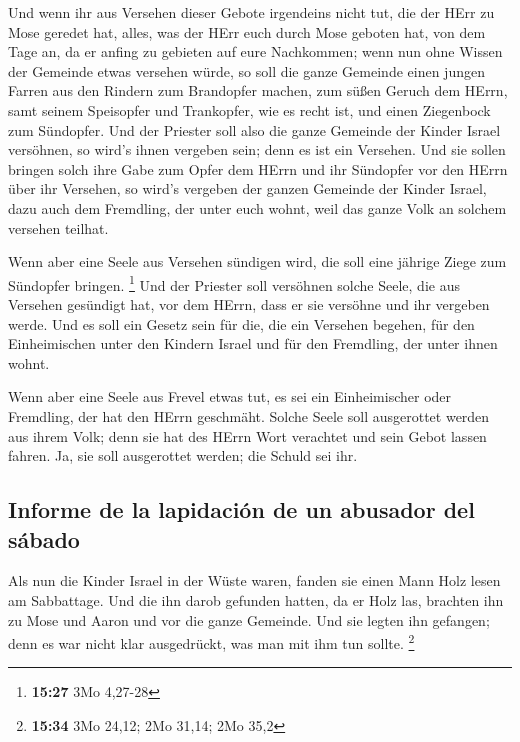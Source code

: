  Und wenn ihr aus Versehen dieser Gebote irgendeins nicht
tut, die der HErr zu Mose geredet hat,  alles, was der
HErr euch durch Mose geboten hat, von dem Tage an, da er anfing zu
gebieten auf eure Nachkommen;  wenn nun ohne Wissen der
Gemeinde etwas versehen würde, so soll die ganze Gemeinde einen jungen
Farren aus den Rindern zum Brandopfer machen, zum süßen Geruch dem
HErrn, samt seinem Speisopfer und Trankopfer, wie es recht ist, und
einen Ziegenbock zum Sündopfer.  Und der Priester soll
also die ganze Gemeinde der Kinder Israel versöhnen, so wird's ihnen
vergeben sein; denn es ist ein Versehen. Und sie sollen bringen solch
ihre Gabe zum Opfer dem HErrn und ihr Sündopfer vor den HErrn über ihr
Versehen,  so wird's vergeben der ganzen Gemeinde der
Kinder Israel, dazu auch dem Fremdling, der unter euch wohnt, weil das
ganze Volk an solchem versehen teilhat.

 Wenn aber eine Seele aus Versehen sündigen wird, die
soll eine jährige Ziege zum Sündopfer bringen. \footnote{\textbf{15:27}
  3Mo 4,27-28}  Und der Priester soll versöhnen solche
Seele, die aus Versehen gesündigt hat, vor dem HErrn, dass er sie
versöhne und ihr vergeben werde.  Und es soll ein Gesetz
sein für die, die ein Versehen begehen, für den Einheimischen unter den
Kindern Israel und für den Fremdling, der unter ihnen wohnt.

 Wenn aber eine Seele aus Frevel etwas tut, es sei ein
Einheimischer oder Fremdling, der hat den HErrn geschmäht. Solche Seele
soll ausgerottet werden aus ihrem Volk;  denn sie hat des
HErrn Wort verachtet und sein Gebot lassen fahren. Ja, sie soll
ausgerottet werden; die Schuld sei ihr.

\hypertarget{informe-de-la-lapidaciuxf3n-de-un-abusador-del-suxe1bado}{%
\subsection{Informe de la lapidación de un abusador del
sábado}\label{informe-de-la-lapidaciuxf3n-de-un-abusador-del-suxe1bado}}

 Als nun die Kinder Israel in der Wüste waren, fanden sie
einen Mann Holz lesen am Sabbattage.  Und die ihn darob
gefunden hatten, da er Holz las, brachten ihn zu Mose und Aaron und vor
die ganze Gemeinde.  Und sie legten ihn gefangen; denn es
war nicht klar ausgedrückt, was man mit ihm tun sollte. \footnote{\textbf{15:34}
  3Mo 24,12; 2Mo 31,14; 2Mo 35,2}

